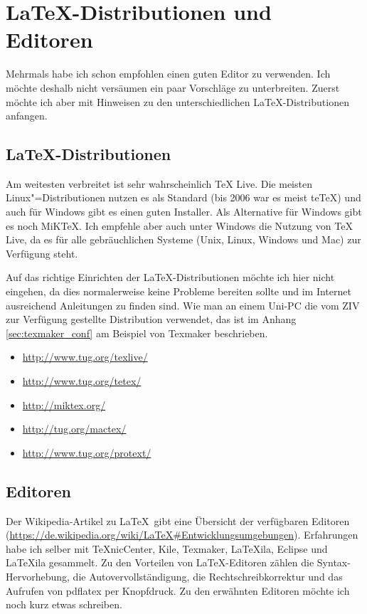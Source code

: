 \chapter{\LaTeX-Distributionen und Editoren}

Mehrmals habe ich schon empfohlen einen guten Editor zu verwenden. Ich möchte deshalb nicht versäumen ein paar Vorschläge zu unterbreiten. Zuerst möchte ich aber mit Hinweisen zu den unterschiedlichen \LaTeX-Distributionen anfangen.

\section{\LaTeX-Distributionen}

Am weitesten verbreitet ist sehr wahrscheinlich TeX Live. Die meisten Linux"=Distributionen nutzen es als Standard (bis 2006 war es meist teTeX) und auch für Windows gibt es einen guten Installer. Als Alternative für Windows gibt es noch MiKTeX. Ich empfehle aber auch unter Windows die Nutzung von TeX Live, da es für alle gebräuchlichen Systeme (Unix, Linux, Windows und Mac) zur Verfügung steht.

Auf das richtige Einrichten der \LaTeX-Distributionen möchte ich hier nicht eingehen, da dies normalerweise keine Probleme bereiten sollte und im Internet ausreichend Anleitungen zu finden sind. Wie man an einem Uni-PC die vom ZIV zur Verfügung gestellte Distribution verwendet, das ist im Anhang \ref{sec:texmaker_conf} am Beispiel von Texmaker beschrieben.

\begin{itemize}
    \item \url{http://www.tug.org/texlive/}
    \item \url{http://www.tug.org/tetex/}
    \item \url{http://miktex.org/}
    \item \url{http://tug.org/mactex/}
    \item \url{http://www.tug.org/protext/}
\end{itemize}

\section{Editoren}

Der Wikipedia-Artikel zu \LaTeX\ gibt eine Übersicht der verfügbaren Editoren (\url{https://de.wikipedia.org/wiki/LaTeX#Entwicklungsumgebungen}). Erfahrungen habe ich selber mit TeXnicCenter, Kile, Texmaker, LaTeXila, Eclipse und LaTeXila gesammelt. Zu den Vorteilen von \LaTeX-Editoren zählen die Syntax-Hervorhebung, die Autovervollständigung, die Rechtschreibkorrektur und das Aufrufen von pdflatex per Knopfdruck. Zu den erwähnten Editoren möchte ich noch kurz etwas schreiben.

